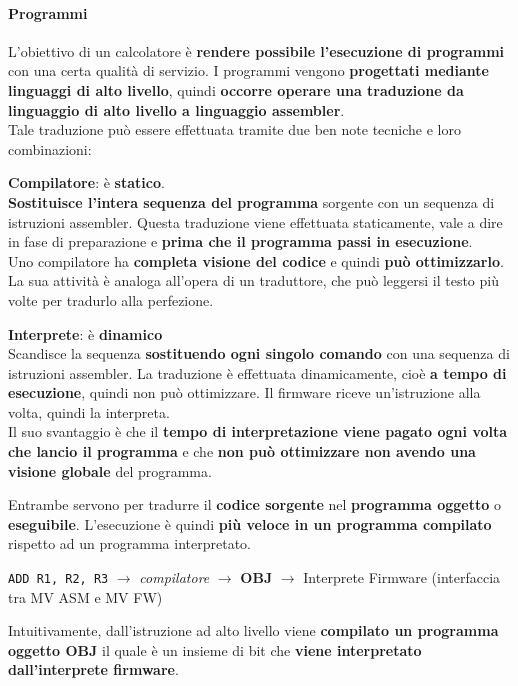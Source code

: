 \documentclass[10pt]{report}
\begin{document}
\paragraph{Programmi} L'obiettivo di un calcolatore è \textbf{rendere possibile l'esecuzione di programmi} con una certa qualità di servizio. I programmi vengono \textbf{progettati mediante linguaggi di alto livello}, quindi \textbf{occorre operare una traduzione da linguaggio di alto livello a linguaggio assembler}.\\
Tale traduzione può essere effettuata tramite due ben note tecniche e loro combinazioni:
\begin{multicols}{2}
\textbf{Compilatore}: è \textbf{statico}.\\\textbf{Sostituisce l'intera sequenza del programma} sorgente con un sequenza di istruzioni assembler. Questa traduzione viene effettuata staticamente, vale a dire in fase di preparazione e \textbf{prima che il programma passi in esecuzione}.\\
Uno compilatore ha \textbf{completa visione del codice} e quindi \textbf{può ottimizzarlo}. La sua attività è analoga all'opera di un traduttore, che può leggersi il testo più volte per tradurlo alla perfezione.
\columnbreak

\textbf{Interprete}: è \textbf{dinamico}\\ Scandisce la sequenza \textbf{sostituendo ogni singolo comando} con una sequenza di istruzioni assembler. La traduzione è effettuata dinamicamente, cioè \textbf{a tempo di esecuzione}, quindi non può ottimizzare. Il firmware riceve un'istruzione alla volta, quindi la interpreta.\\
Il suo svantaggio è che il \textbf{tempo di interpretazione viene pagato ogni volta che lancio il programma} e che \textbf{non può ottimizzare non avendo una visione globale} del programma.
\end{multicols}
Entrambe servono per tradurre il \textbf{codice sorgente} nel \textbf{programma oggetto} o \textbf{eseguibile}. L'esecuzione è quindi \textbf{più veloce in un programma compilato} rispetto ad un programma interpretato.
\begin{center}
\texttt{ADD R1, R2, R3} $\longrightarrow$ \textit{compilatore} $\longrightarrow$ \textbf{OBJ} $\longrightarrow$ Interprete Firmware (interfaccia tra MV ASM e MV FW)
\end{center}
Intuitivamente, dall'istruzione ad alto livello viene \textbf{compilato un programma oggetto OBJ} il quale è un insieme di bit che \textbf{viene interpretato dall'interprete firmware}.
\end{document}
